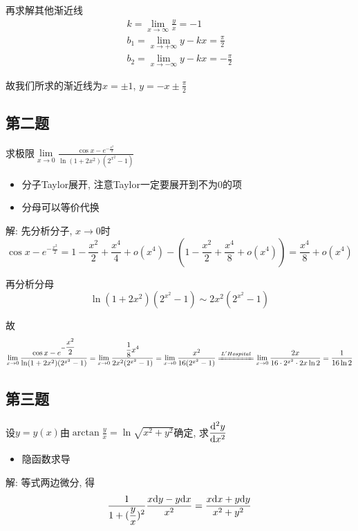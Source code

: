 \documentclass[10pt]{SelfArx} %
\numberwithin{dummy}{section}
\newenvironment{corollary}{\begin{cBox}\noindent{\bf\color{color1} 分析}}{\end{cBox}}
\begin{document}
再求解其他渐近线
\begin{gather}
	k=\lim_{x\to\infty}\displaystyle\frac{y}{x}=-1\nonumber\\
	b_1=\lim_{x\to+\infty}y-kx=\displaystyle\frac{\pi}{2}\nonumber\\
	b_2=\lim_{x\to-\infty}y-kx=-\displaystyle\frac{\pi}{2}\nonumber
\end{gather}

故我们所求的渐近线为$x=\pm 1$, $y=-x\pm\displaystyle\frac{\pi}{2}$
\subsection{第二题}
求极限$\lim\limits_{x\to 0}\displaystyle\frac{\cos x-e^{-\displaystyle\frac{x^2}{2}}}{\ln(1+2x^2)(2^{x^2}-1)}$
\begin{corollary}
	\begin{itemize}
		\item 分子Taylor展开, 注意Taylor一定要展开到不为0的项
		\item 分母可以等价代换
	\end{itemize}
\end{corollary}
解: 先分析分子, $x\to 0$时
\begin{displaymath}
	\cos x-e^{-\displaystyle\frac{x^2}{2}}=1-\displaystyle\frac{x^2}{2}+\displaystyle\frac{x^4}{4}+o(x^4)-(1-\displaystyle\frac{x^2}{2}+\displaystyle\frac{x^4}{8}+o(x^4))=\displaystyle\frac{x^4}{8}+o(x^4)
\end{displaymath}

再分析分母
\begin{displaymath}
	\ln(1+2x^2)(2^{x^2}-1)\sim 2x^2(2^{x^2}-1)
\end{displaymath}

故
\begin{displaymath}
	\lim_{x\to 0}\displaystyle\frac{\cos x-e^{-\displaystyle\frac{x^2}{2}}}{\ln(1+2x^2)(2^{x^2}-1)}=\lim_{x\to 0}\displaystyle\frac{\displaystyle\frac{1}{8}x^4}{2x^2(2^{x^2}-1)}=\lim_{x\to 0}\displaystyle\frac{x^2}{16(2^{x^2}-1)}\xlongequal{L'Hospital}\lim_{x\to 0}\displaystyle\frac{2x}{16\cdot 2^{x^2}\cdot 2x\ln 2}=\displaystyle\frac{1}{16\ln 2}
\end{displaymath}
\subsection{第三题}
设$y=y(x)$由$\arctan\displaystyle\frac{y}{x}=\ln\sqrt{x^2+y^2}$确定, 求$\displaystyle\frac{{\rm d}^2 y}{{\rm d} x^2}$
\begin{corollary}
	\begin{itemize}
		\item 隐函数求导
	\end{itemize}
\end{corollary}
解: 等式两边微分, 得
\begin{displaymath}
	\displaystyle\frac{1}{1+(\displaystyle\frac{y}{x})^2}\displaystyle\frac{x{\rm d}y-y{\rm d}x}{x^2}=\displaystyle\frac{x{\rm d}x+y{\rm d}y}{x^2+y^2}
\end{displaymath}
\end{document}
